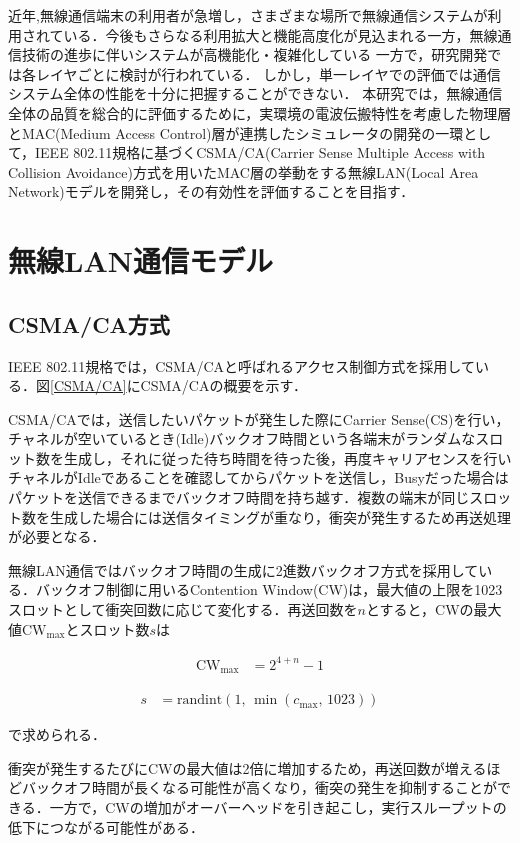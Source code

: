 \documentclass[a4paper, 10pt]{ltjsarticle}
\begin{document}
近年,無線通信端末の利用者が急増し，さまざまな場所で無線通信システムが利用されている．今後もさらなる利用拡大と機能高度化が見込まれる一方，無線通信技術の進歩に伴いシステムが高機能化・複雑化している
一方で，研究開発では各レイヤごとに検討が行われている．
しかし，単一レイヤでの評価では通信システム全体の性能を十分に把握することができない．
本研究では，無線通信全体の品質を総合的に評価するために，実環境の電波伝搬特性を考慮した物理層とMAC(Medium Access Control)層が連携したシミュレータの開発の一環として，IEEE 802.11規格に基づくCSMA/CA(Carrier Sense Multiple Access with Collision Avoidance)方式を用いたMAC層の挙動をする無線LAN(Local Area Network)モデルを開発し，その有効性を評価することを目指す．


\section{無線LAN通信モデル}


\subsection{CSMA/CA方式}

IEEE 802.11規格では，CSMA/CAと呼ばれるアクセス制御方式を採用している．図\ref{CSMA/CA}にCSMA/CAの概要を示す．


CSMA/CAでは，送信したいパケットが発生した際にCarrier Sense(CS)を行い，チャネルが空いているとき(Idle)バックオフ時間という各端末がランダムなスロット数を生成し，それに従った待ち時間を待った後，再度キャリアセンスを行いチャネルがIdleであることを確認してからパケットを送信し，Busyだった場合はパケットを送信できるまでバックオフ時間を持ち越す．複数の端末が同じスロット数を生成した場合には送信タイミングが重なり，衝突が発生するため再送処理が必要となる．

無線LAN通信ではバックオフ時間の生成に2進数バックオフ方式を採用している．バックオフ制御に用いるContention Window(CW)は，最大値の上限を1023スロットとして衝突回数に応じて変化する．再送回数を$n$とすると，CWの最大値$\mathrm{CW}_{\max}$とスロット数$s$は


\begin{align}
  \mathrm{CW}_{\max} &= 2^{4 + n} - 1
\end{align}

\begin{align}
  s &= \mathrm{randint}(1, \, \min(c_{\max}, \, 1023))
  \label{slot}
\end{align}

で求められる．

衝突が発生するたびにCWの最大値は2倍に増加するため，再送回数が増えるほどバックオフ時間が長くなる可能性が高くなり，衝突の発生を抑制することができる．一方で，CWの増加がオーバーヘッドを引き起こし，実行スループットの低下につながる可能性がある．
\end{document}
